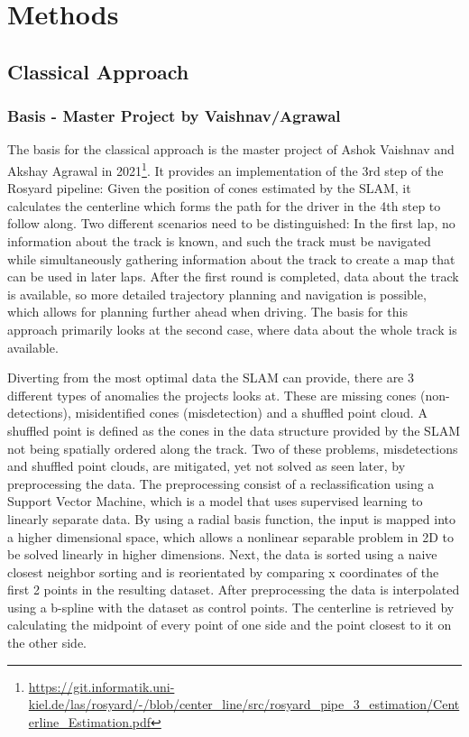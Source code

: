 \graphicspath{{Chapter/Figs/methods/}}
\chapter{Methods}


\section{Classical Approach}

\subsection{Basis - Master Project by Vaishnav/Agrawal}
The basis for the classical approach is the master project of Ashok Vaishnav and Akshay Agrawal in 2021\footnote{\url{https://git.informatik.uni-kiel.de/las/rosyard/-/blob/center_line/src/rosyard_pipe_3_estimation/Centerline_Estimation.pdf}}.
It provides an implementation of the 3rd step of the Rosyard pipeline: Given the position of cones estimated by the SLAM, it calculates the centerline which forms the path for the driver in the 4th step to follow along.
Two different scenarios need to be distinguished: In the first lap, no information about the track is known, and such the track must be navigated while simultaneously gathering information about the track to create a map that can be used in later laps. After the first round is completed, data about the track is available, so more detailed trajectory planning and navigation is possible, which allows for planning further ahead when driving. The basis for this approach primarily looks at the second case, where data about the whole track is available.

Diverting from the most optimal data the SLAM can provide, there are 3 different types of anomalies the projects looks at. These are missing cones (non-detections), misidentified cones (misdetection) and a shuffled point cloud. A shuffled point is defined as the cones in the data structure provided by the SLAM not being spatially ordered along the track. Two of these problems, misdetections and shuffled point clouds, are mitigated, yet not solved as seen later, by preprocessing the data. The preprocessing consist of a reclassification using a Support Vector Machine\cite{cortes1995}, which is a model that uses supervised learning to linearly separate data. By using a radial basis function, the input is mapped into a higher dimensional space, which allows a nonlinear separable problem in 2D to be solved linearly in higher dimensions. Next, the data is sorted using a naive closest neighbor sorting and is reorientated by comparing x coordinates of the first 2 points in the resulting dataset. After preprocessing the data is interpolated using a b-spline with the dataset as control points. The centerline is retrieved by calculating the midpoint of every point of one side and the point closest to it on the other side.

